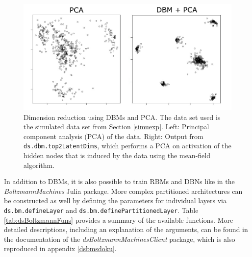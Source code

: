 \documentclass[12pt]{article}
\newcommand{\inlinecode}[1]{\texttt{#1}}
\newcommand{\apkg}[1]{\emph{#1}}
\begin{document}
 \begin{figure}[!hb]
   \centering
   \includegraphics[scale=1]{images/dbmvspca.pdf}
   \caption{Dimension reduction using DBMs and PCA. The data set used is the simulated data set from Section \ref{simuexp}. Left: Principal component analysis (PCA) of the data. Right: Output from \inlinecode{ds.dbm.top2LatentDims}, which performs a PCA on  activation of the hidden nodes that is induced by the data using the mean-field algorithm.}
   \label{fig:dbmvspca}
 \end{figure}

In addition to DBMs, it is also possible to train RBMs and DBNs like in the \apkg{BoltzmannMachines} Julia package.
More complex partitioned architectures can be constructed as well by defining the parameters for individual layers via \inlinecode{ds.bm.defineLayer} and \inlinecode{ds.bm.definePartitionedLayer}.
Table \ref{tab:dsBoltzmannFuns} provides a summary of the available functions.
More detailed descriptions, including an explanation of the arguments, can be found in the documentation of the \apkg{dsBoltzmannMachinesClient} package, which is also reproduced in appendix \ref{dsbmsdoku}.
\end{document}
